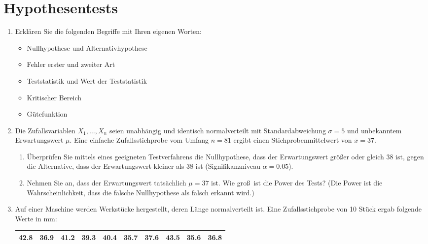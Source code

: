\section{Hypothesentests}

\begin{enumerate}
\item Erkl\"{a}ren Sie die folgenden Begriffe mit Ihren eigenen Worten:
\begin{itemize}
\item Nullhypothese und Alternativhypothese
\item Fehler erster und zweiter Art
\item Teststatistik und Wert der Teststatistik
\item Kritischer Bereich
\item G\"{u}tefunktion
\end{itemize}

\item Die Zufallsvariablen $X_{1},\ldots ,X_{n}$ seien unabh\"{a}ngig und
identisch normalverteilt mit Standardabweichung $\sigma =5$ und unbekanntem
Erwartungswert $\mu $. Eine einfache Zufallsstichprobe vom Umfang $n=81$
ergibt einen Stichprobenmittelwert von $\bar{x}=37$.

\begin{enumerate}
\item \"{U}berpr\"{u}fen Sie mittels eines geeigneten Testverfahrens die
Nullhypothese, dass der Erwartungswert gr\"{o}\ss er oder gleich 38 ist,
gegen die Alternative, dass der Erwartungswert kleiner als 38 ist
(Signifikanzniveau $\alpha =0.05$).

\item Nehmen Sie an, dass der Erwartungswert tats\"{a}chlich $\mu =37$ ist.
Wie gro\ss\ ist die Power des Tests? (Die Power ist die Wahrscheinlichkeit,
dass die falsche Nullhypothese als falsch erkannt wird.)
\end{enumerate}

\item Auf einer Maschine werden Werkst\"{u}cke hergestellt, deren L\"{a}nge
normalverteilt ist. Eine Zufallsstichprobe von 10 St\"{u}ck ergab folgende
Werte in mm:

\begin{center}%
\begin{tabular}{|c|c|c|c|c|c|c|c|c|c|}
\hline
42.8 & 36.9 & 41.2 & 39.3 & 40.4 & 35.7 & 37.6 & 43.5 & 35.6 & 36.8 \\ \hline
\end{tabular}
\end{center}%


\end{enumerate}
